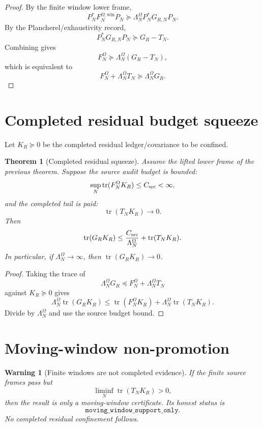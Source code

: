 \documentclass[11pt]{article}
\newtheorem{theorem}{Theorem}
\newtheorem{warning}{Warning}
\begin{document}
\begin{proof}
By the finite window lower frame,
\[
P_N^*F_N^{\Omega,\mathrm{win}}P_N\succeq \Lambda_N^\Omega P_N^*G_{R,N}P_N.
\]
By the Plancherel/exhaustivity record,
\[
P_N^*G_{R,N}P_N\succeq G_R-T_N.
\]
Combining gives
\[
F_N^\Omega\succeq \Lambda_N^\Omega(G_R-T_N),
\]
which is equivalent to
\[
F_N^\Omega+\Lambda_N^\Omega T_N\succeq \Lambda_N^\Omega G_R.
\]
\end{proof}

\section{Completed residual budget squeeze}
Let \(K_R\succeq0\) be the completed residual ledger/covariance to be confined.

\begin{theorem}[Completed residual squeeze]
Assume the lifted lower frame of the previous theorem.  Suppose the source audit budget is bounded:
\begin{equation}
\sup_N\operatorname{tr}(F_N^\Omega K_R)\le C_{\rm src}<\infty,
\end{equation}
and the completed tail is paid:
\begin{equation}
\operatorname{tr}(T_NK_R)\to0.
\end{equation}
Then
\begin{equation}
\operatorname{tr}(G_RK_R)
\le
\frac{C_{\rm src}}{\Lambda_N^\Omega}
+
\operatorname{tr}(T_NK_R).
\end{equation}
In particular, if \(\Lambda_N^\Omega\to\infty\), then \(\operatorname{tr}(G_RK_R)\to0\).
\end{theorem}

\begin{proof}
Taking the trace of
\[
\Lambda_N^\Omega G_R\preceq F_N^\Omega+\Lambda_N^\Omega T_N
\]
against \(K_R\succeq0\) gives
\[
\Lambda_N^\Omega\operatorname{tr}(G_RK_R)
\le
\operatorname{tr}(F_N^\Omega K_R)+
\Lambda_N^\Omega\operatorname{tr}(T_NK_R).
\]
Divide by \(\Lambda_N^\Omega\) and use the source budget bound.
\end{proof}

\section{Moving-window non-promotion}
\begin{warning}[Finite windows are not completed evidence]
If the finite source frames pass but
\[
\liminf_N\operatorname{tr}(T_NK_R)>0,
\]
then the result is only a moving-window certificate.  Its honest status is
\[
\boxed{\texttt{moving\_window\_support\_only}.}
\]
No completed residual confinement follows.
\end{warning}
\end{document}

